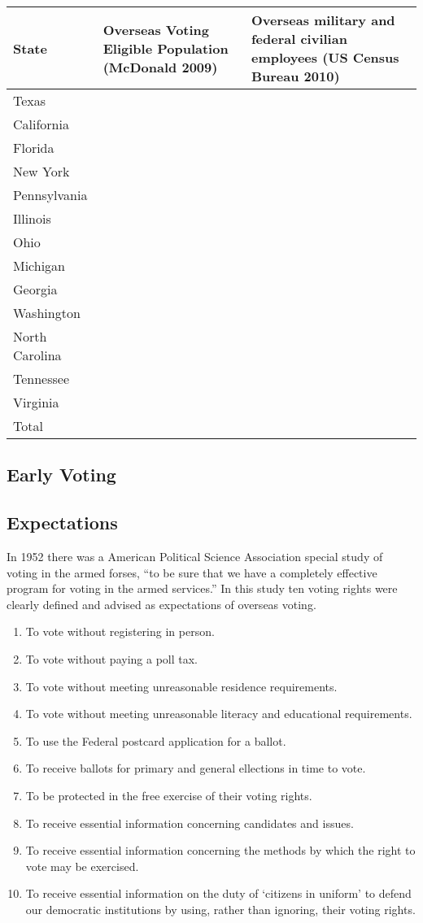 \begin{center}
\begin{tabular}{l p{} p{}} %
{\bf State} & {\bf Overseas Voting Eligible Population} (McDonald 2009) & {\bf Overseas military and federal civilian employees} (US Census Bureau 2010)\\\hline
Texas\\
California\\
Florida\\
New York\\
Pennsylvania\\
Illinois\\
Ohio\\
Michigan\\
Georgia\\
Washington\\
North Carolina\\
Tennessee\\
Virginia\\\hline
Total
\end{tabular}
\end{center}
\subsection{Early Voting}
\subsection{Expectations}

In 1952 there was a American Political Science Association special study of voting in the armed forses, ``to be sure that we have a completely effective program for voting in the armed services.'' In this study ten voting rights were clearly defined and advised as expectations of overseas voting.

\begin{enumerate}
  \item To vote without registering in person.
  \item To vote without paying a poll tax.
  \item To vote without meeting unreasonable residence requirements.
  \item To vote without meeting unreasonable literacy and educational requirements.
  \item To use the Federal postcard application for a ballot.
  \item To receive ballots for primary and general ellections in time to vote.
  \item To be protected in the free exercise of their voting rights.
  \item To receive essential information concerning candidates and issues.
  \item To receive essential information concerning the methods by which the right to vote may be exercised.
  \item To receive essential information on the duty of `citizens in uniform' to defend our democratic institutions by using, rather than ignoring, their voting rights.
\end{enumerate}

